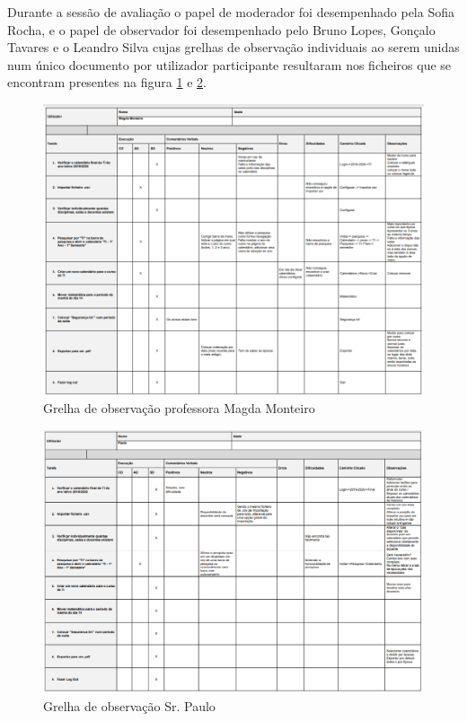 \documentclass[11pt, twoside]{report}
\begin{document}
	
	Durante a sessão de avaliação o papel de moderador foi desempenhado pela Sofia Rocha, e o papel de observador foi desempenhado pelo Bruno Lopes, Gonçalo Tavares e o Leandro Silva cujas grelhas de observação individuais ao serem unidas num único documento por utilizador participante resultaram nos ficheiros que se encontram presentes na figura \ref{grelhaObservacaoMagda} e \ref{grelhaObservacaoPaulo}.
	
	\clearpage
	\begin{landscape}
		\pagestyle{empty}
		\begin{figure}[H] 
			\centering 							\includegraphics[width=1.23\textwidth,height=1.23\textheight,keepaspectratio]{image/testes_prototipo_baixo_fidelidade/grelha_observadores_magda}
			\caption{Grelha de observação professora Magda Monteiro}
			\label{grelhaObservacaoMagda}
		\end{figure}
		\begin{figure}[H] 
			\centering 							\includegraphics[width=1.4\textwidth,height=1.4\textheight,keepaspectratio]{image/testes_prototipo_baixo_fidelidade/grelha_observadores_paulo}
			\caption{Grelha de observação Sr. Paulo}
			\label{grelhaObservacaoPaulo}
		\end{figure}
	\end{landscape}
	
\end{document}
